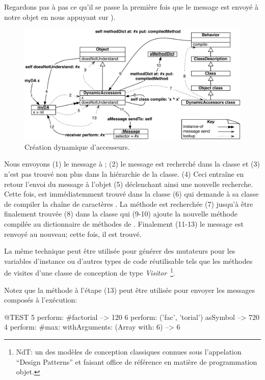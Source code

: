 \documentclass[a4paper,10pt,twoside]{book}
\begin{document}
Regardons pas à pas ce qu'il se passe la première fois que le message 
 est envoyé à notre objet en nous appuyant sur ).

\begin{figure}[ht]\centering
	\includegraphics[width=\linewidth]{DynamicAccessors}
	\caption{Création dynamique d'accesseurs.}
\end{figure}

Nous envoyons (1) le message  à ; (2) le message est recherché dans la classe et (3) n'est pas trouvé non plus dans la hiérarchie de la classe. (4) Ceci entraîne en retour l'envoi du message  à l'objet (5) déclenchant ainsi une nouvelle recherche. Cette fois,  est immédiatemment trouvé dans la classe  (6) qui demande à sa classe de compiler la chaîne de caractères . La méthode  est recherchée (7) jusqu'à être finalement trouvée (8) dans la classe  qui (9-10) ajoute la nouvelle méthode compilée au dictionnaire de méthodes de . Finalement (11-13) le message est renvoyé au nouveau; cette fois, il est trouvé.

La même technique peut être utilisée pour générer des mutateurs pour les variables d'instance ou d'autres types de code réutilisable tels que les méthodes de visites d'une classe de conception de type \emph{Visitor}~\footnote{NdT: un des modèles de conception classiques connues sous l'appelation ``Design Patterns'' et faisant office de référence en matière de programmation objet.}.

Notez que la méthode  à l'étape (13) peut être utilisée pour envoyer les messages composés à l'exécution:
\begin{code}{@TEST}
5 perform: #factorial                                             --> 120
6 perform: ('fac', 'torial') asSymbol                       --> 720
4 perform: #max: withArguments: (Array with: 6) --> 6
\end{code}
\end{document}

